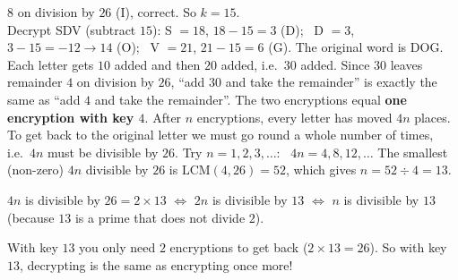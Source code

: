 {$8$ on division by $26$ (I), correct. So $k = 15$.\\
Decrypt \textsf{SDV} (subtract $15$): S $= 18$, $18 - 15 = 3$ (D); \ D $= 3$, $3 - 15 = -12 \to 14$ (O); \ V $= 21$, $21 - 15 = 6$ (G).
The original word is \textsf{DOG}.
Each letter gets $10$ added and then $20$ added, i.e.\ $30$ added. Since $30$ leaves remainder $4$ on division by $26$, ``add $30$ and
take the remainder'' is exactly the same as ``add $4$ and take the remainder''. The two encryptions equal \textbf{one encryption with
key $4$}.
After $n$ encryptions, every letter has moved $4n$ places. To get back to the original letter we must go round a whole number of
times, i.e.\ $4n$ must be divisible by $26$. Try $n = 1, 2, 3, \dots$: \ $4n = 4, 8, 12, \dots$ The smallest (non-zero) $4n$
divisible by $26$ is $\text{LCM}(4, 26) = 52$, which gives $n = 52 \div 4 = 13$.
\begin{recallbox}$4n$ is divisible by $26 = 2\times 13$ $\Leftrightarrow$ $2n$ is divisible by $13$ $\Leftrightarrow$ $n$ is divisible
by $13$ (because $13$ is a prime that does not divide $2$).\end{recallbox}
\begin{tipbox}With key $13$ you only need $2$ encryptions to get back ($2\times 13 = 26$). So with key $13$,
decrypting is the same as encrypting once more!\end{tipbox}
}

